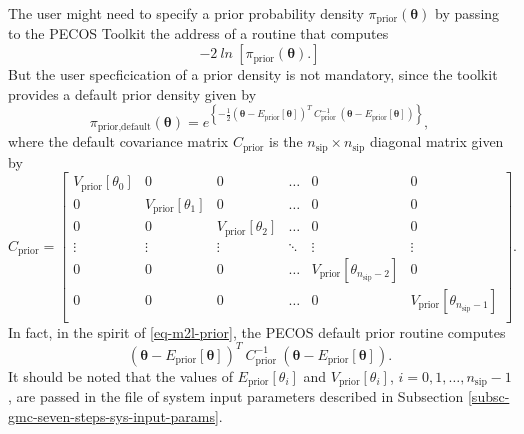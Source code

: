 The user might need to specify a prior probability density $\pi_{\text{prior}}(\boldsymbol{\theta})$
by passing to the PECOS Toolkit the address of a routine that computes
\begin{equation}\label{eq-m2l-prior}
-2~ln~
\left[
\pi_{\text{prior}}(\boldsymbol{\theta}).
\right]
\end{equation}
But the user specficication of a prior density is not mandatory, since the toolkit provides a default prior density given by
\begin{equation*}
\pi_{\text{prior,default}}(\boldsymbol{\theta}) =
e^{
\left\{
-\frac{1}{2}
(\boldsymbol{\theta}-E_{\text{prior}}[\boldsymbol{\theta}])^T
~C_{\text{prior}}^{-1}~
(\boldsymbol{\theta}-E_{\text{prior}}[\boldsymbol{\theta}])
\right\}
},
\end{equation*}
where the default covariance matrix $C_{\text{prior}}$ is the $n_{\text{sip}}\times n_{\text{sip}}$ diagonal matrix given by
\begin{equation}\label{eq-default-prior-cov-matrix}
C_{\text{prior}} =
\left[
\begin{array}{cccccc}
V_{\text{prior}}[\theta_0] & 0                          & 0                          & \ldots & 0                                           & 0      \\
0                          & V_{\text{prior}}[\theta_1] & 0                          & \ldots & 0                                           & 0      \\
0                          & 0                          & V_{\text{prior}}[\theta_2] & \ldots & 0                                           & 0      \\
\vdots                     & \vdots                     & \vdots                     & \ddots & \vdots                                      & \vdots \\
0                          & 0                          & 0                          & \ldots & V_{\text{prior}}[\theta_{n_{\text{sip}}-2}] & 0      \\
0                          & 0                          & 0                          & \ldots & 0                                           & V_{\text{prior}}[\theta_{n_{\text{sip}}-1}] \\
\end{array}
\right].
\end{equation}
In fact, in the spirit of \eqref{eq-m2l-prior}, the PECOS default prior routine computes
\begin{equation*}
(\boldsymbol{\theta}-E_{\text{prior}}[\boldsymbol{\theta}])^T
~C_{\text{prior}}^{-1}~
(\boldsymbol{\theta}-E_{\text{prior}}[\boldsymbol{\theta}]).
\end{equation*}
It should be noted that the values of $E_{\text{prior}}[\theta_i]$ and $V_{\text{prior}}[\theta_i]$, $i=0,1,\ldots,n_{\text{sip}}-1$, are passed in the file of system input parameters described in Subsection \ref{subsc-gmc-seven-steps-sys-input-params}.

